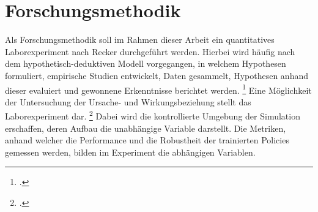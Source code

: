 \section{Forschungsmethodik}

Als Forschungsmethodik soll im Rahmen dieser Arbeit ein quantitatives Laborexperiment nach Recker \cite*[]{Recker.2021} durchgeführt werden.
Hierbei wird häufig nach dem hypothetisch-deduktiven Modell vorgegangen, in welchem Hypothesen formuliert, empirische Studien entwickelt, Daten gesammelt, Hypothesen anhand dieser evaluiert und gewonnene Erkenntnisse berichtet werden. \footcite[Vgl.][S. S.89f.]{Recker.2021}
Eine Möglichkeit der Untersuchung der Ursache- und Wirkungsbeziehung stellt das Laborexperiment dar. \footcite[Vgl.][S. 106]{Recker.2021}
Dabei wird die kontrollierte Umgebung der Simulation erschaffen, deren Aufbau die unabhängige Variable darstellt.
Die Metriken, anhand welcher die Performance und die Robustheit der trainierten Policies gemessen werden, bilden im Experiment die abhängigen Variablen.

